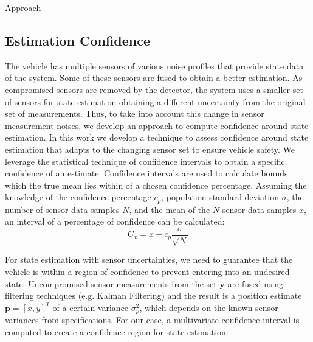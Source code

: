 \begin{section}{Approach}
\subsection{Estimation Confidence}

The vehicle has multiple sensors of various noise profiles that provide state data of the system. Some of these sensors are fused to obtain a better estimation. As compromised sensors are removed by the detector, the system uses a smaller set of sensors for state estimation obtaining a different uncertainty from the original set of measurements. Thus, to take into account this change in sensor measurement noises, we develop an approach to compute confidence around state estimation. In this work we develop a technique to assess confidence around state estimation that adapts to the changing sensor set to ensure vehicle safety. We leverage the statistical technique of confidence intervals \cite{devore2011probability} to obtain a specific confidence of an estimate. Confidence intervals are used to calculate bounds which the true mean lies within of a chosen confidence percentage. Assuming the knowledge of the confidence percentage $c_p$, population standard deviation $\sigma$, the number of sensor data samples $N$, and the mean of the $N$ sensor data samples $\bar{x}$, an interval of a percentage of confidence can be calculated:
    \begin{equation}
     \label{Confidence_interval}
		C_x = \bar{x} + c_p\frac{\sigma}{\sqrt{N}}
	\end{equation}
	
	
For state estimation with sensor uncertainties, we need to guarantee that the vehicle is within a region of confidence to prevent entering into an undesired state. Uncompromised sensor measurements from the set $\bm{y}$ are fused using filtering techniques (e.g. Kalman Filtering) and the result is a position estimate $\bm{p}=[x,y]^T$ of a certain variance $\sigma_p^2$, which depends on the known sensor variances from specifications. For our case, a multivariate confidence interval is computed to create a confidence region for state estimation. 



\end{section}

